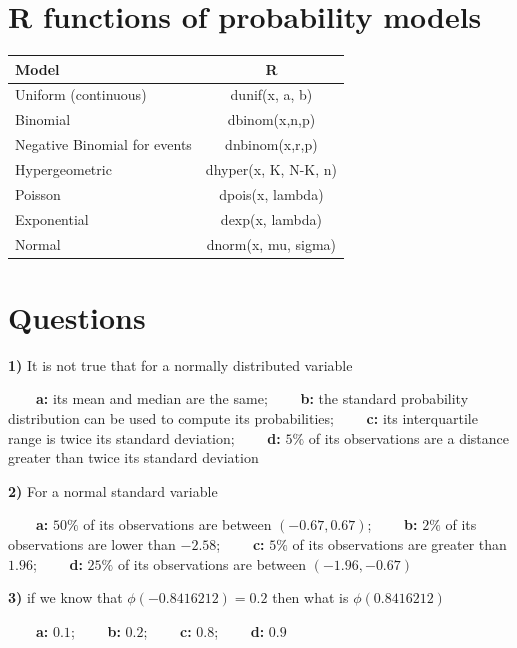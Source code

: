 \documentclass[
]{book}
\begin{document}
\hypertarget{r-functions-of-probability-models}{%
\section{R functions of probability models}\label{r-functions-of-probability-models}}

\begin{longtable}[]{@{}lc@{}}
\toprule\noalign{}
Model & R \\
\midrule\noalign{}
\endhead
\bottomrule\noalign{}
\endlastfoot
Uniform (continuous) & dunif(x, a, b) \\
Binomial & dbinom(x,n,p) \\
Negative Binomial for events & dnbinom(x,r,p) \\
Hypergeometric & dhyper(x, K, N-K, n) \\
Poisson & dpois(x, lambda) \\
Exponential & dexp(x, lambda) \\
Normal & dnorm(x, mu, sigma) \\
\end{longtable}

\hypertarget{questions-6}{%
\section{Questions}\label{questions-6}}

\textbf{1)} It is not true that for a normally distributed variable

\textbf{\(\qquad\)a:} its mean and median are the same; \textbf{\(\qquad\)b:} the standard probability distribution can be used to compute its probabilities; \textbf{\(\qquad\)c:} its interquartile range is twice its standard deviation; \textbf{\(\qquad\)d:} \(5\%\) of its observations are a distance greater than twice its standard deviation

\textbf{2)} For a normal standard variable

\textbf{\(\qquad\)a:} \(50\%\) of its observations are between \((-0.67,0.67)\);
\textbf{\(\qquad\)b:} \(2\%\) of its observations are lower than \(-2.58\);
\textbf{\(\qquad\)c:} \(5\%\) of its observations are greater than \(1.96\);
\textbf{\(\qquad\)d:} \(25\%\) of its observations are between \((-1.96,-0.67)\)

\textbf{3)} if we know that \(\phi(-0.8416212)=0.2\) then what is \(\phi(0.8416212)\)

\textbf{\(\qquad\)a:} \(0.1\);
\textbf{\(\qquad\)b:} \(0.2\);
\textbf{\(\qquad\)c:} \(0.8\);
\textbf{\(\qquad\)d:} \(0.9\)
\end{document}

